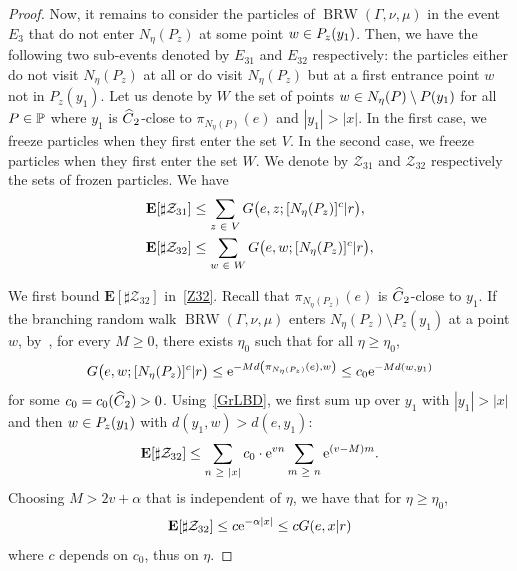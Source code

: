 \documentclass[10pt]{amsart}
\theoremstyle{definition}\newtheorem{defi}[theo]{Definition}\newtheorem{rema}[theo]{Remark}\newtheorem{exam}[theo]{Example}\newtheorem{exem}[theo]{Example}\newtheorem{nota}[theo]{Notation}
\newcommand{\bbP}{\mathbb{P}}
\newcommand{\rme}{\mathrm{e}}
\newcommand{\bfE}{\mathbf{E}}
\newcommand{\clZ}{\mathcal{Z}}
\DeclareMathOperator{\BRW}{BRW}
\let\originalleft\left
\let\originalright\right
\renewcommand{\left}{\mathopen{}\mathclose\bgroup\originalleft}
\renewcommand{\right}{\aftergroup\egroup\originalright}
\let\oldin\in
\renewcommand{\in}{\mathchoice{\oldin}{\oldin}{\,\oldin\,}{\,\oldin\,}}
\let\oldge\ge
\renewcommand{\ge}{\mathchoice{\oldge}{\oldge}{\,\oldge\,}{\,\oldge\,}}
\let\oldle\le
\renewcommand{\le}{\mathchoice{\oldle}{\oldle}{\,\oldle\,}{\,\oldle\,}}
\let\oldhat\hat
\renewcommand*{\hat}[1]{\mathchoice{\widehat{#1}}{\widehat{#1}}{\oldhat{#1}}{\oldhat{#1}}}
\begin{document}
\begin{proof}
Now, it remains to consider the particles of $\BRW(\Gamma,\nu,\mu)$ in the event $E_3$ that do not enter $N_\eta(P_z)$ at some point $w\in P_z(y_1)$. Then, we have the following two sub-events denoted by $E_{31}$ and $E_{32}$ respectively: the particles either do not visit $N_\eta(P_z)$ at all or do visit $N_\eta(P_z)$ but at a first entrance point $w$ not in $P_z(y_1)$. Let us denote by $W$ the set of points $w\in N_\eta(P)\setminus P(y_1)$ for all $P\in \bbP$ where $y_1$ is $\hat C_2$-close to $ \pi_{N_\eta(P)}(e)$ and $|y_1|>|x|$. In the first case, we freeze particles when they first enter the set $V$. In the second case, we freeze particles when they first enter the set $W$. We denote by $\clZ_{31}$ and $\clZ_{32}$ respectively the sets of frozen particles. We have
\begin{align}
\bfE[\sharp \clZ_{31}]&\leq \sum_{z\in V} G\bigl(e,z;[N_\eta(P_z)]^c|r\bigr),\label{Z31}\\
\bfE[\sharp \clZ_{32}]&\leq \sum_{w\in W} G\bigl(e,w;[N_\eta(P_z)]^c|r\bigr),\label{Z32}
\end{align}


We first bound $\bfE[\sharp \clZ_{32}]$ in~\eqref{Z32}. Recall that $\pi_{N_{\eta}(P_z)}(e)$ is $\hat C_2$-close to $y_1$. If the branching random walk $\BRW(\Gamma,\nu,\mu)$ enters $N_\eta(P_z)\setminus P_z(y_1)$ at a point $w$, by~\cite[Lemma~2.12]{DWY}, for every $M\geq 0$, there exists $\eta_0$ such that for all $\eta\geq \eta_0$,
\[
G\bigl(e,w;[N_\eta(P_z)]^c|r\bigr)\leq \rme^{-M d\left(\pi_{N_{\eta}(P_z)}(e),w\right)}\leq c_0 \rme^{-M d(w,y_1)}
\]
for some $c_0=c_0(\hat C_2)>0$. Using~\eqref{GrLBD}, we first sum up over $y_1$ with $|y_1|>|x|$ and then $w\in P_z(y_1)$ with $d(y_1, w)>d(e, y_1)$:
\[
\bfE[\sharp \clZ_{32}]\leq \sum_{n\ge |x|} c_0 \cdot \rme^{vn} \sum_{m\ge n} \rme^{(v- M)m}.
\]
Choosing $M>2v+\alpha$ that is independent of $\eta$, we have that for $\eta\geq \eta_0$,
\[
\bfE[\sharp \clZ_{32}]\leq c\rme^{-\alpha |x|} \le c G(e,x|r)
\]
where $c$ depends on $c_0$, thus on $\eta$.


\end{proof}
\end{document}
